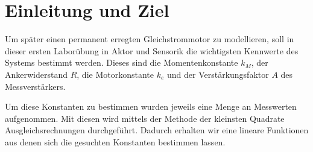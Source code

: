 \section{Einleitung und Ziel}

Um später einen permanent erregten Gleichstrommotor zu modellieren, soll
in dieser ersten Laborübung in Aktor und Sensorik die wichtigsten
Kennwerte des Systems bestimmt werden. Dieses sind die Momentenkonstante
$k_M$, der Ankerwiderstand $R$, die Motorkonstante $k_e$ und der
Verstärkungsfaktor $A$ des Messverstärkers. 

Um diese Konstanten zu bestimmen wurden jeweils eine Menge an Messwerten
aufgenommen. Mit diesen wird mittels der Methode der kleinsten Quadrate 
Ausgleichsrechnungen durchgeführt. Dadurch erhalten wir eine lineare
Funktionen aus denen sich die gesuchten Konstanten bestimmen lassen.